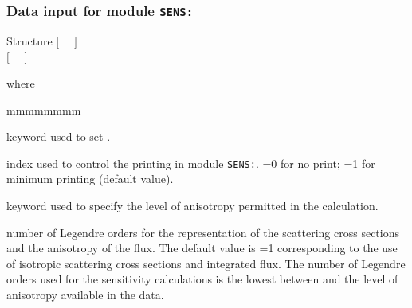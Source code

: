 \subsubsection{Data input for module {\tt SENS:}}\label{sect:descSENS}

\vskip -0.5cm

\begin{DataStructure}{Structure }
$[$~ ~$]$ \\
$[$~ ~$]$ \\
\moc{;}
\end{DataStructure}

\noindent where
\begin{ListeDeDescription}{mmmmmmmm}

\item[\moc{EDIT}] keyword used to set .

\item[\dusa{iprint}] index used to control the printing in module {\tt SENS:}. =0 for no print; =1 for minimum printing (default value).

\item[\moc{ANIS}] keyword used to specify the level  of anisotropy permitted in the calculation.

\item[\dusa{nanis}] number of Legendre orders for the representation of the scattering cross sections and the anisotropy of the flux. The default value is =1 corresponding to the use of isotropic scattering cross sections and integrated flux. The number of Legendre orders used for the sensitivity calculations is the lowest between  and the level of anisotropy available in the  data.

\end{ListeDeDescription}

\eject
